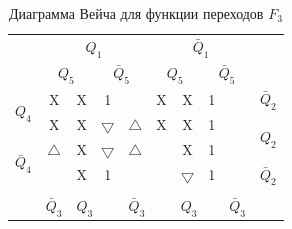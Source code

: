 \documentclass[a4paper,14pt]{article}
\begin{document}

\begin{table}[H]
	\begin{center}
		\caption{\label{tab:F3_tab} Диаграмма Вейча для функции переходов $F_3$ }
		\begin{tabular}{cccccccccc}
			& \multicolumn{4}{c}{$Q_1$} & \multicolumn{4}{c}{$\bar{Q}_1$} &  \\
			& \multicolumn{2}{c}{$Q_5$} & \multicolumn{2}{c}{$\bar{Q}_5$} & \multicolumn{2}{c}{$Q_5$} & \multicolumn{2}{c}{$\bar{Q}_5$} &  \\ \cline{2-9}
			\multicolumn{1}{c|}{\multirow{2}{*}{$Q_4$}} & \multicolumn{1}{c|}{X} & \multicolumn{1}{c|}{X} & \multicolumn{1}{c|}{1} & \multicolumn{1}{c|}{} & \multicolumn{1}{c|}{X} & \multicolumn{1}{c|}{X} & \multicolumn{1}{c|}{1} & \multicolumn{1}{c|}{} & $\bar{Q}_2$ \\ \cline{2-9}
			\multicolumn{1}{c|}{} & \multicolumn{1}{c|}{X} & \multicolumn{1}{c|}{X} & \multicolumn{1}{c|}{$\bigtriangledown$} & \multicolumn{1}{c|}{$\bigtriangleup$} & \multicolumn{1}{c|}{X} & \multicolumn{1}{c|}{X} & \multicolumn{1}{c|}{1} & \multicolumn{1}{c|}{} & \multirow{2}{*}{$Q_2$} \\ \cline{2-9}
			\multicolumn{1}{c|}{\multirow{2}{*}{$\bar{Q}_4$}} & \multicolumn{1}{c|}{$\bigtriangleup$} & \multicolumn{1}{c|}{X} & \multicolumn{1}{c|}{$\bigtriangledown$} & \multicolumn{1}{c|}{$\bigtriangleup$} & \multicolumn{1}{c|}{} & \multicolumn{1}{c|}{X} & \multicolumn{1}{c|}{1} & \multicolumn{1}{c|}{} &  \\ \cline{2-9}
			\multicolumn{1}{c|}{} & \multicolumn{1}{c|}{} & \multicolumn{1}{c|}{X} & \multicolumn{1}{c|}{1} & \multicolumn{1}{c|}{} & \multicolumn{1}{c|}{} & \multicolumn{1}{c|}{$\bigtriangledown$} & \multicolumn{1}{c|}{1} & \multicolumn{1}{c|}{} & $\bar{Q}_2$ \\ \cline{2-9}
			&  & \multicolumn{2}{c}{} & \multicolumn{2}{c}{} & \multicolumn{2}{c}{} &  &  \\
			\multicolumn{1}{l}{} & \multicolumn{1}{l}{$\bar{Q}_3$} & \multicolumn{2}{l}{$Q_3$} & \multicolumn{2}{l}{$\bar{Q}_3$} & \multicolumn{2}{l}{$Q_3$} & \multicolumn{1}{l}{$\bar{Q}_3$} & \multicolumn{1}{l}{}
		\end{tabular}
	\end{center}
\end{table}

\end{document}
